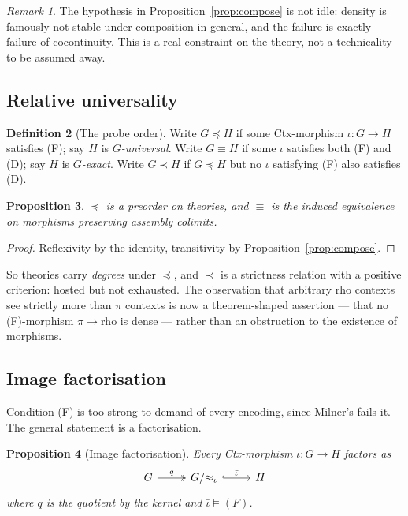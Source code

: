 \documentclass[11pt,a4paper]{article}
\theoremstyle{definition}
\newtheorem{definition}{Definition}[section]
\theoremstyle{plain}
\newtheorem{proposition}[definition]{Proposition}
\theoremstyle{remark}
\newtheorem{remark}[definition]{Remark}
\begin{document}
\begin{remark}
The hypothesis in Proposition~\ref{prop:compose} is not idle: density is famously not
stable under composition in general, and the failure is exactly failure of
cocontinuity. This is a real constraint on the theory, not a technicality to be
assumed away.
\end{remark}

\subsection{Relative universality}

\begin{definition}[The probe order]
\label{def:order}
Write $G \preceq H$ if some Ctx-morphism $\iota : G \to H$ satisfies (F); say $H$ is
\emph{$G$-universal}. Write $G \equiv H$ if some $\iota$ satisfies both (F) and (D);
say $H$ is \emph{$G$-exact}. Write $G \prec H$ if $G \preceq H$ but no $\iota$
satisfying (F) also satisfies (D).
\end{definition}

\begin{proposition}
$\preceq$ is a preorder on theories, and $\equiv$ is the induced equivalence on
morphisms preserving assembly colimits.
\end{proposition}

\begin{proof}
Reflexivity by the identity, transitivity by Proposition~\ref{prop:compose}.
\end{proof}

So theories carry \emph{degrees} under $\preceq$, and $\prec$ is a strictness
relation with a positive criterion: hosted but not exhausted. The observation that
arbitrary rho contexts see strictly more than $\pi$ contexts is now a
theorem-shaped assertion --- that no (F)-morphism $\pi \to \text{rho}$ is dense ---
rather than an obstruction to the existence of morphisms.

\subsection{Image factorisation}

Condition (F) is too strong to demand of every encoding, since Milner's fails it.
The general statement is a factorisation.

\begin{proposition}[Image factorisation]
\label{prop:factor}
Every Ctx-morphism $\iota : G \to H$ factors as
\[
\begin{tikzcd}[column sep=2.6em]
G \arrow[r, two heads, "q"] & G/{\approx_\iota} \arrow[r, hook, "\bar\iota"] & H
\end{tikzcd}
\]
where $q$ is the quotient by the kernel and $\bar\iota \models (F)$.
\end{proposition}
\end{document}
